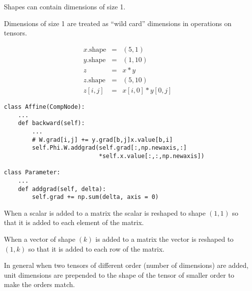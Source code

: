 {{

Shapes can contain dimensions of size 1.

\vfill
Dimensions of size 1 are treated as ``wild card'' dimensions in operations on tensors.

\vfill
\begin{eqnarray*}
  x.\mathrm{shape} & = & (5,1) \\
  y.\mathrm{shape} & = & (1,10) \\
  z & = & x*y \\
  z.\mathrm{shape} & = & (5,10) \\
  z[i,j] & = & x[i,0] * y[0,j]
\end{eqnarray*}

\vfill
\eject
\vfill
\begin{verbatim}
class Affine(CompNode):
    ...
    def backward(self):
        ...
        # W.grad[i,j] += y.grad[b,j]x.value[b,i]
        self.Phi.W.addgrad(self.grad[:,np.newaxis,:]
                           *self.x.value[:,:,np.newaxis])

class Parameter:
    ...
    def addgrad(self, delta):
        self.grad += np.sum(delta, axis = 0)
\end{verbatim}


When a scalar is added to a matrix the scalar is reshaped to shape $(1,1)$ so that it is added to each element of the matrix.

\vfill
When a vector of shape $(k)$ is added to a matrix the vector is reshaped to $(1,k)$ so that it is added to each row of the matrix.

\vfill
In general when two tensors of different order (number of dimensions) are added, unit dimensions are prepended to the shape of the tensor of smaller order
to make the orders match.
}

}


